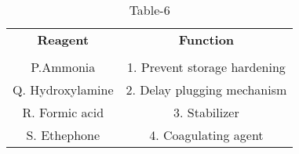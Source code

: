 \begin{table}[htbp]
  \centering
  \caption{Table-6}
  \label{table6}
  \begin{tabular}{cc}
  \textbf{Reagent} & \textbf{Function} \\ \\
    P.Ammonia  & 1. Prevent storage hardening \\
    Q. Hydroxylamine & 2. Delay plugging mechanism \\
    R. Formic acid & 3. Stabilizer \\
    S. Ethephone & 4. Coagulating agent \\
  \end{tabular}
\end{table}